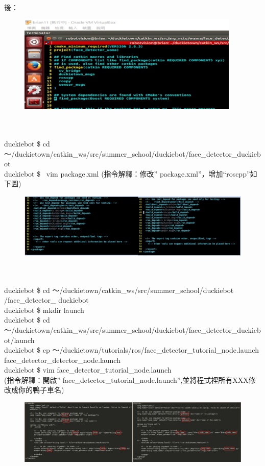 \documentclass{article}
\begin{document}
\\
後：
\begin{figure}[htp]
    \begin{center}
        \includegraphics[width=300pt]{pic/5_3_4.png}
    \end{center}
\end{figure}
\\
\\duckiebot \$ cd ～/duckietown/catkin\_ws/src/summer\_school/duckiebot/face\_detector\_duckiebot
\\duckiebot \$  vim package.xml
(指令解釋：修改” package.xml”，增加“roscpp”如下圖)
\begin{figure}[htp]
    \begin{center}
        \includegraphics[width=400pt]{pic/5_3_5.png}
    \end{center}
\end{figure}
\\
\\duckiebot \$ cd ～/duckietown/catkin\_ws/src/summer\_school/duckiebot /face\_detector\_ duckiebot
\\duckiebot \$ mkdir launch
\\duckiebot \$ cd ～/duckietown/catkin\_ws/src/summer\_school/duckiebot/face\_detector\_duckiebot/launch
\\duckiebot \$ cp ～/duckietown/tutorials/ros/face\_detector\_tutorial\_node.launch face\_detector\_detector\_node.launch
\\duckiebot \$ vim face\_detector\_tutorial\_node.launch
\\(指令解釋：開啟” face\_detector\_tutorial\_node.launch”,並將程式裡所有XXX修改成你的鴨子車名)
\begin{figure}[htp]
    \begin{center}
        \includegraphics[width=400pt]{pic/5_3_10.png}
    \end{center}
\end{figure}
\end{document}
